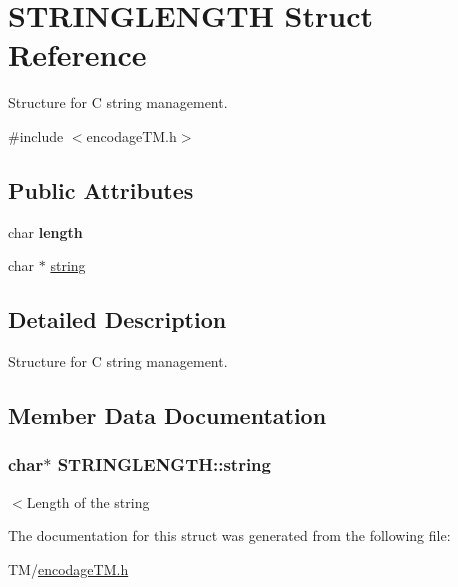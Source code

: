 \hypertarget{structSTRINGLENGTH}{}\section{S\+T\+R\+I\+N\+G\+L\+E\+N\+G\+TH Struct Reference}
\label{structSTRINGLENGTH}


Structure for C string management.  




{\ttfamily \#include $<$encodage\+T\+M.\+h$>$}

\subsection*{Public Attributes}
\begin{DoxyCompactItemize}
\item 
char {\bfseries length}\hypertarget{structSTRINGLENGTH_ae19f4684b9c7022e38732173f64c92ac}{}\label{structSTRINGLENGTH_ae19f4684b9c7022e38732173f64c92ac}

\item 
char $\ast$ \hyperlink{structSTRINGLENGTH_a179103e260fab276620b5684bc2e2a7d}{string}
\end{DoxyCompactItemize}


\subsection{Detailed Description}
Structure for C string management. 

\subsection{Member Data Documentation}
\subsubsection[{\texorpdfstring{string}{string}}]{\setlength{\rightskip}{0pt plus 5cm}char$\ast$ S\+T\+R\+I\+N\+G\+L\+E\+N\+G\+T\+H\+::string}\hypertarget{structSTRINGLENGTH_a179103e260fab276620b5684bc2e2a7d}{}\label{structSTRINGLENGTH_a179103e260fab276620b5684bc2e2a7d}
$<$Length of the string 

The documentation for this struct was generated from the following file\+:\begin{DoxyCompactItemize}
\item 
T\+M/\hyperlink{encodageTM_8h}{encodage\+T\+M.\+h}\end{DoxyCompactItemize}
